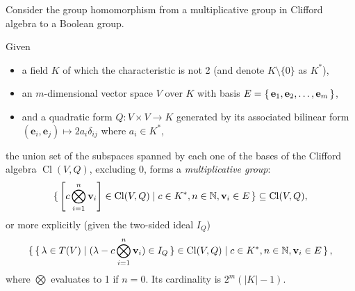 \documentclass[12pt, letterpaper]{article}
\makeatletter
\newcommand{\nat}{\mathbb{N}}
\newcommand{\Cl}{\operatorname{Cl}}
\newcommand\ie{i.e\@ifnextchar.{}{.\@}}
\newcommand{\card}[1]{\left\lvert #1 \right\rvert}
\newcommand{\ec}[1]{\left[{#1}\right]}
\theoremstyle{definition}
\theoremstyle{remark}
\theoremstyle{definition}
\theoremstyle{plain}
\numberwithin{equation}{section}
\makeatother
\begin{document}
	Consider the group homomorphism from a multiplicative group in Clifford algebra to a Boolean group.
	
	Given
	\begin{itemize}
		\item a field $K$ of which the characteristic is not 2  (and denote $K\setminus\{0\}$ as $K^*$),
		\item an $m$-dimensional vector space $V$ over $K$ %
		with basis $E=\set{\mathbf{e}_1,\mathbf{e}_2,\dots,\mathbf{e}_m}$,%
		\item and a quadratic form $Q\colon V\times V \to K$
		generated by its associated bilinear form
		$(\mathbf{e}_i,\mathbf{e}_j)\mapsto 2a_{i}\delta_{ij}$ where $a_i\in K^*$,
	\end{itemize}
%
%	
%	
	the union set of the subspaces spanned by each one of the bases of
	the Clifford algebra $\Cl(V,Q)$,
	excluding $0$,
	forms a \textit{multiplicative group}:
	\[\set{\ec{c\bigotimes_{i=1}^n\mathbf{v}_i}\in \Cl(V,Q)|c\in K^*, n\in\nat, \mathbf{v}_i\in E}\subseteq \Cl(V,Q), \]
	or more explicitly (given the two-sided ideal $I_Q$)
	\[\set{\set{\lambda \in T(V)| (\lambda-c\bigotimes_{i=1}^n\mathbf{v}_i)\in I_Q} \in \Cl(V,Q)|c\in K^*, n\in\nat, \mathbf{v}_i\in E}, \]
	where $\bigotimes$ evaluates to 1 if $n=0$.
	Its cardinality is $2^{m}(\card{K}-1)$.
	
\end{document}
